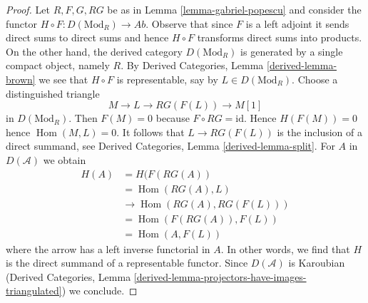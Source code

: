 \documentclass[10pt,a4paper]{amsart}
\theoremstyle{plain}
\theoremstyle{definition}
\theoremstyle{remark}
\numberwithin{equation}{subsection}
\def\Hom{\mathop{\mathrm{Hom}}\nolimits}
\begin{document}
\begin{proof}
Let $R, F, G, RG$ be as in Lemma \ref{lemma-gabriel-popescu}
and consider the functor $H \circ F : D(\text{Mod}_R) \to \textit{Ab}$.
Observe that since $F$ is a left adjoint it sends direct sums to
direct sums and hence $H \circ F$ transforms direct sums into products.
On the other hand, the derived category $D(\text{Mod}_R)$ is
generated by a single compact object, namely $R$.
By Derived Categories, Lemma \ref{derived-lemma-brown}
we see that $H \circ F$ is representable, say by $L \in D(\text{Mod}_R)$.
Choose a distinguished triangle
$$
M \to L \to RG(F(L)) \to M[1]
$$
in $D(\text{Mod}_R)$. Then $F(M) = 0$ because $F \circ RG = \text{id}$.
Hence $H(F(M)) = 0$ hence $\Hom(M, L) = 0$.
It follows that $L \to RG(F(L))$ is the inclusion of a direct summand, see
Derived Categories, Lemma \ref{derived-lemma-split}.
For $A$ in $D(\mathcal{A})$ we obtain
\begin{align*}
H(A)
& =
H(F(RG(A)) \\
& =
\Hom(RG(A), L) \\
& \to
\Hom(RG(A), RG(F(L))) \\
& =
\Hom(F(RG(A)), F(L)) \\
& =
\Hom(A, F(L))
\end{align*}
where the arrow has a left inverse functorial in $A$. In other words, we find
that $H$ is the direct summand of a representable functor.
Since $D(\mathcal{A})$ is Karoubian
(Derived Categories, Lemma
\ref{derived-lemma-projectors-have-images-triangulated}) we conclude.
\end{proof}
\end{document}
